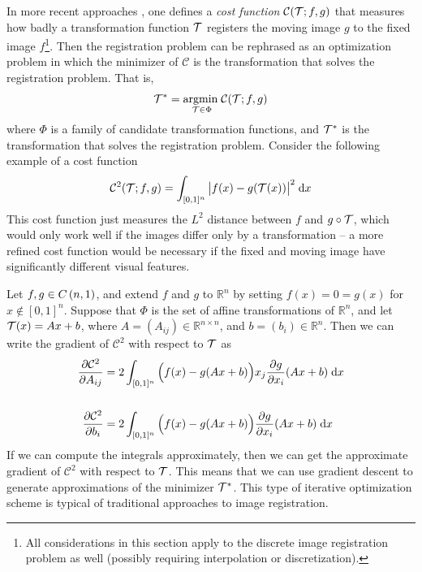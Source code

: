 \documentclass{article}
\newcommand{\argmin}[1]{\underset{{#1}}{\mathrm{argmin}\;}}
\newcommand{\dee}{\;\mathrm{d}}
\newcommand{\R}{\mathbb{R}}
\begin{document}
	\newcommand{\cost}{\mathcal{C}}
	In more recent approaches \cite{christensen-johnson}, one defines a \textit{cost function} \(\cost(\transf; f, g)\) that measures how badly a transformation function \(\mathcal{T}\) registers the moving image \(g\) to the fixed image \(f\)\footnote{All considerations in this section apply to the discrete image registration problem as well (possibly requiring interpolation or discretization).}. Then the registration problem can be rephrased as an optimization problem in which the minimizer of \(\cost\) is the transformation that solves the registration problem. That is,
	\begin{equation}\label{eq:optimization_registration}
		\transf^* = \argmin{\transf \in \Phi} \cost(\transf; f, g)
	\end{equation}
	where \(\Phi\) is a family of candidate transformation functions, and \(\mathcal{T}^*\) is the transformation that solves the registration problem. Consider the following example of a cost function
	\begin{equation}\label{eq:L2_registration_cost}
		\cost^2(\transf; f, g) = \int_{[0,1]^n}\big|f(x) - g(\transf(x))\big|^2\dee x
	\end{equation}
	This cost function just measures the \(L^2\) distance between \(f\) and \(g\circ \mathcal{T}\), which would only work well if the images differ only by a transformation -- a more refined cost function would be necessary if the fixed and moving image have significantly different visual features.
	
	Let \(f,g\in {C\left(n, 1\right)}\), and extend \(f\) and \(g\) to \(\R^n\) by setting \(f(x) = 0 = g(x)\) for \(x \notin [0,1]^n\). Suppose that \(\Phi\) is the set of affine transformations of \(\R^n\), and let \(\mathcal{T}(x) = Ax + b\), where \(A = (A_{ij}) \in \R^{n\times n}\), and \(b = (b_i) \in \R^n\). Then we can write the gradient of \(\cost^2\) with respect to \(\mathcal{T}\) as
	\begin{align}
		\label{eq:grad_A}
		\frac{\partial \cost^2}{\partial A_{ij}} &= 2 \int_{\unitcube} \Big(f(x) - g(Ax + b)\Big)x_j\frac{\partial g}{\partial x_i}(Ax + b) \dee x \\\notag
		\\
		\label{eq:grad_b}
		\frac{\partial \cost^2}{\partial b_i} &= 2 \int_{\unitcube} \Big(f(x) - g(Ax + b)\Big)\frac{\partial g}{\partial x_i}(Ax + b) \dee x
	\end{align}
	If we can compute the integrals approximately, then we can get the approximate gradient of \(\cost^2\) with respect to \(\mathcal{T}\). This means that we can use gradient descent to generate approximations of the minimizer \(\mathcal{T}^*\). This type of iterative optimization scheme is typical of traditional approaches to image registration.
	
\end{document}
